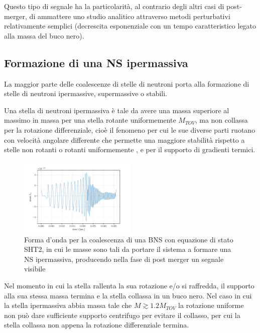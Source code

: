 Questo tipo di segnale ha la particolarità, al contrario degli altri casi di post-merger, di ammattere uno studio analitico attraverso metodi perturbativi relativamente semplici (decrescita esponenziale con un tempo caratteristico legato alla massa del buco nero)\cite{maggiore2018gravitational}.

\subsection{Formazione di una NS ipermassiva}
\label{subsection:ipermassiva}	
La maggior parte delle coalescenze di stelle di neutroni porta alla formazione di stelle di neutroni ipermassive, supermassive o stabili. 

Una stella di neutroni ipermassiva è tale da avere una massa superiore al massimo in massa per una stella rotante uniformemente $M_{TOV}$, ma non collassa per la rotazione differenziale, cioè il fenomeno per cui le sue diverse parti ruotano con velocità angolare differente che permette una maggiore stabilità rispetto a stelle non rotanti o rotanti uniformemente \cite{Baumgarte_2000}, e per il supporto di gradienti termici.

\begin{figure}
	\vspace{-35pt}
	\begin{center}
		\includegraphics[width=0.5\textwidth]{figures/Capitolo_1/SHT2.0.pdf}
	\end{center}
	\vspace{-10pt}
	\caption{Forma d'onda per la coalescenza di una BNS con equazione di stato SHT2, in cui le masse sono tali da portare il sistema a formare una NS ipermassiva, producendo nella fase di post merger un segnale visibile}
	\label{fig:FormaOndaToNS}
	\vspace{-30pt}
\end{figure}
Nel momento in cui la stella rallenta la sua rotazione e/o si raffredda, il supporto alla sua stessa massa termina e la stella collassa in un buco nero. 
Nel caso in cui la stella ipermassiva abbia massa tale che $M \gtrsim 1.2 M_{TOV}$ la rotazione uniforme non può dare sufficiente supporto centrifugo per evitare il collasso, per cui la stella collassa non appena la rotazione differenziale termina.

